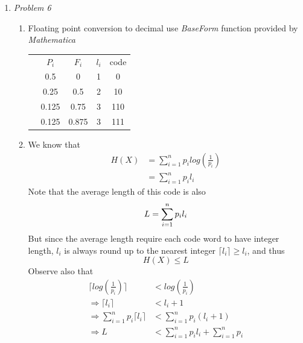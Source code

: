 \documentclass[12pt]{article}
\begin{document}
\begin{enumerate}
\begin{enumerate}
    \end{enumerate}
    \newpage
    \item\textit{Problem 6}
    \begin{enumerate}
        \item Floating point conversion to decimal use \textit{BaseForm} function provided by \textit{Mathematica}\\
        \begin{center}
            \begin{tabular}{ c  c  c  c  c }
                 &  $P_i$ & $F_i$ & $l_i$ & code \\
                 & 0.5 & 0 & 1 & 0\\
                 & 0.25 & 0.5 & 2 & 10\\
                 & 0.125 & 0.75 & 3 & 110\\
                 & 0.125 & 0.875 & 3 & 111\\
            \end{tabular}
        \end{center}
        \item We know that\\
        \begin{align*}
            H(X) &= \sum_{i=1}^{n} p_ilog(\frac{1}{p_i})\\
            &= \sum_{i=1}^{n} p_il_i
        \end{align*}
        Note that the average length of this code is also\\
        \begin{equation*}
            L = \sum_{i=1}^{n} p_il_i\\
        \end{equation*}
        But since the average length require each code word to have integer length, $l_i$ is always round up to the nearest integer $\lceil l_i \rceil \geq l_i$, and thus
        \begin{equation}
            H(X) \leq L
        \end{equation}
        Observe also that
        \begin{align*}
            \lceil log(\frac{1}{p_i}) \rceil &< log(\frac{1}{p_i}) \\
            \Rightarrow \lceil l_i \rceil &< l_i +1\\
            \Rightarrow \sum_{i=1}^{n} p_i\lceil l_i \rceil &< \sum_{i=1}^{n} p_i(l_i + 1)\\
            \Rightarrow L &< \sum_{i=1}^{n} p_il_i + \sum_{i=1}^{n} p_i\\

\end{align*}
\end{enumerate}
\end{enumerate}
\end{document}

